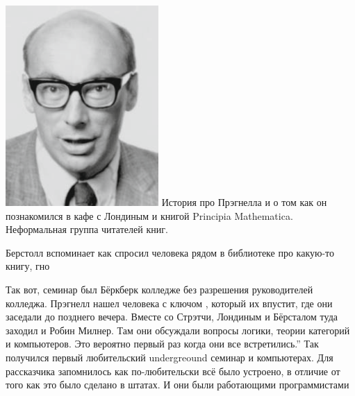 \documentclass[14pt]{matmex-diploma-custom}
\begin{document}
\includegraphics[angle=0,scale=0.585]{220px-Peter_Landin.png}
История про Прэгнелла и о том как он познакомился в кафе с Лондиным и книгой Principia Mathematica. Неформальная группа читателей книг. 
\begin{framed}
Берстолл вспоминает как спросил человека рядом в библиотеке про какую-то книгу, гно
\end{framed}

Так вот, семинар был Бёркберк колледже без разрешения руководителей колледжа. Прэгнелл нашел человека с ключом , который их впустит, где они заседали до позднего вечера. Вместе  со Стрэтчи, Лондиным и Бёрсталом туда заходил и Робин Милнер. Там они обсуждали вопросы логики, теории категорий и компьютеров. Это вероятно первый раз когда они все встретились.” Так получился первый любительский undergreound семинар и компьютерах. Для рассказчика запомнилось как по-любительски всё было устроено, в отличие от того как это было сделано в штатах. И они были работающими программистами
\end{document}
